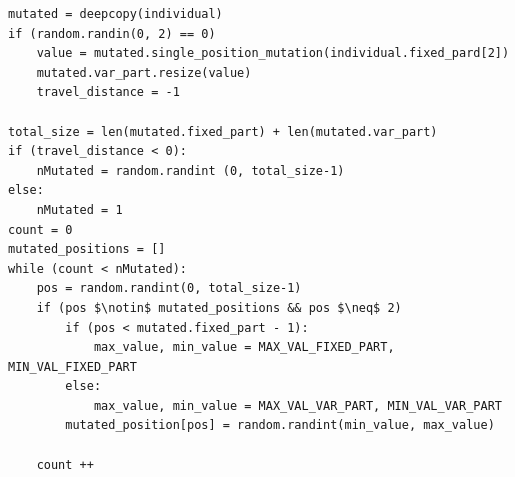 \documentclass[letterpaper]{article}%
\begin{document}
\begin{lstlisting}[mathescape=true]
mutated = deepcopy(individual)
if (random.randin(0, 2) == 0)
    value = mutated.single_position_mutation(individual.fixed_pard[2])
    mutated.var_part.resize(value)
    travel_distance = -1 

total_size = len(mutated.fixed_part) + len(mutated.var_part) 
if (travel_distance < 0): 
    nMutated = random.randint (0, total_size-1)
else: 
    nMutated = 1
count = 0
mutated_positions = []
while (count < nMutated):
    pos = random.randint(0, total_size-1)
    if (pos $\notin$ mutated_positions && pos $\neq$ 2)
        if (pos < mutated.fixed_part - 1):
            max_value, min_value = MAX_VAL_FIXED_PART, MIN_VAL_FIXED_PART
        else:
            max_value, min_value = MAX_VAL_VAR_PART, MIN_VAL_VAR_PART
        mutated_position[pos] = random.randint(min_value, max_value)

    count ++
\end{lstlisting}
\clearpage
\twocolumn

\printbibliography
\end{document}
